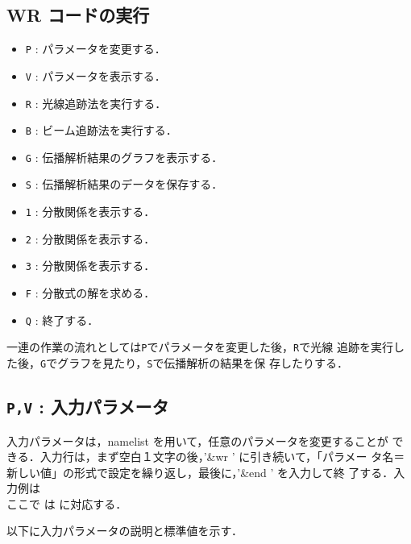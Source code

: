 \documentclass[11pt]{jarticle}
\begin{document}
\subsection{WR コードの実行}
\begin{itemize}
 \item[] {\tt P} : パラメータを変更する．
 \item[] {\tt V} : パラメータを表示する．
 \item[] {\tt R} : 光線追跡法を実行する．
 \item[] {\tt B} : ビーム追跡法を実行する．
 \item[] {\tt G} : 伝播解析結果のグラフを表示する．
 \item[] {\tt S} : 伝播解析結果のデータを保存する．
 \item[] {\tt 1} : 分散関係を表示する．
 \item[] {\tt 2} : 分散関係を表示する．
 \item[] {\tt 3} : 分散関係を表示する．
 \item[] {\tt F} : 分散式の解を求める．
 \item[] {\tt Q} : 終了する．
\end{itemize}

一連の作業の流れとしては{\tt P}でパラメータを変更した後，{\tt R}で光線
追跡を実行した後，{\tt G}でグラフを見たり，{\tt S}で伝播解析の結果を保
存したりする．

\subsection{{\tt P,V} :  入力パラメータ}

入力パラメータは，namelist を用いて，任意のパラメータを変更することが
できる．入力行は，まず空白１文字の後，'\&wr ' に引き続いて，「パラメー
タ名＝新しい値」の形式で設定を繰り返し，最後に，'\&end ' を入力して終
了する．入力例は
\\
ここで  は に対応する．

以下に入力パラメータの説明と標準値を示す．
\end{document}
